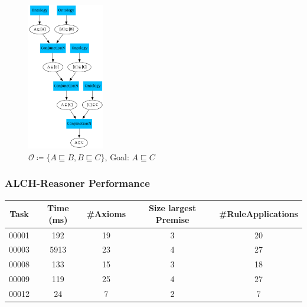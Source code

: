 \documentclass{beamer}
\begin{document}
            \begin{frame}
                \frametitle{}
                \begin{figure}
                    
                    \centering
                    \includegraphics[width=0.30\textwidth]{pictures/longerProofExample2_normalized.png}
                    \caption{$\mathcal{O} \coloneq \{A \sqsubseteq B , B \sqsubseteq C \}$, Goal: $A \sqsubseteq C$}
                
                \end{figure}
                 
             \end{frame}
             
             \begin{frame}
                \frametitle{ALCH-Reasoner Performance}

                {\footnotesize
                
                \begin{table}[h]
                    \centering
                    \begin{tabular}{|c|c|c|c|c|}
                      \hline
                      \textbf{Task} & \textbf{Time (ms)} & \textbf{\#Axioms} & \textbf{Size largest Premise} & \textbf{\#RuleApplications} \\
                      \hline
                      00001 & 192 & 19 & 3 & 20  \\
                      00003 & 5913 & 23 & 4 & 27 \\
                      00008 & 133 & 15 & 3 & 18  \\
                      00009 & 119 & 25 & 4 & 27  \\
                      00012 & 24 & 7 & 2 & 7  \\
                      \hline
                    \end{tabular}
                  \end{table}
                  }
             \end{frame}
\end{document}
